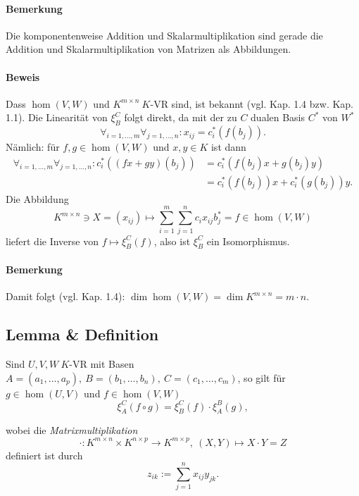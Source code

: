 	\paragraph{Bemerkung}
		Die komponentenweise Addition und Skalarmultiplikation sind gerade die Addition und Skalarmultiplikation von Matrizen als Abbildungen.

	\paragraph{Beweis}
		Dass $ \hom(V,W) $ und $ K^{m\times n} \ K $-VR sind, ist bekannt (vgl. Kap. 1.4 bzw. Kap. 1.1). Die Linearität von $ \xi_B^C $ folgt direkt, da mit der zu $ C $ dualen Basis $ C^* $ von $ W^* $
		\[
			\forall_{i=1,\dots,m} \forall_{j=1,\dots,n}: x_{ij}= c_i^*(f(b_j)).
		\]
		Nämlich: für $ f,g\in \hom(V,W) $ und $ x,y\in K $ ist dann
		\begin{align*}
			\forall_{i= 1,\dots,m} \forall_{j=1,\dots, n} : c_i^*((fx+gy)(b_j)) & = c_i^*(f(b_j)x+g(b_j)y)         \\
			                                                                    & = c_i^*(f(b_j))x+c_i^*(g(b_j))y.
		\end{align*}
		Die Abbildung
		\[
			K^{m\times n}\ni X=(x_{ij})\mapsto \sum_{i=1}^{m}\sum_{j=1}^{n}c_ix_{ij}b_j^* = f\in \hom(V,W)
		\]
		liefert die Inverse von $ f\mapsto\xi_B^C(f) $, also ist $ \xi_B^C $ ein Isomorphismus.
	\paragraph{Bemerkung}
		Damit folgt (vgl. Kap. 1.4): $ \dim \hom(V,W) = \dim K^{m\times n} = m\cdot n $.
\subsection{Lemma \& Definition}
	\begin{Lemma}
		Sind $ U,V,W \ K$-VR mit Basen $ A=(a_1,\dots,a_p),\ B=(b_1,\dots,b_n),\ C=(c_1,\dots,c_m) $, so gilt für $ g\in \hom(U,V) $ und $ f\in \hom(V,W) $
		\[
			\xi_A^C(f\circ g) = \xi_B^C(f)\cdot \xi_A^B(g),
		\]
	\end{Lemma}
	\begin{Definition}
		wobei die \emph{Matrixmultiplikation}
		\[
			\cdot:K^{m\times n}\times K^{n\times p} \to K^{m\times p},\ (X,Y)\mapsto X\cdot Y = Z
		\]
		definiert ist durch
		\[
			z_{ik} := \sum_{j=1}^{n}x_{ij}y_{jk}.
		\]
	\end{Definition}
